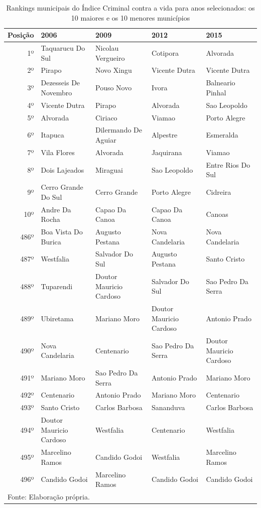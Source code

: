 \documentclass[12pt,openright,oneside,a4paper,english,french,spanish]{abntex2}
\numberwithin{table}{section} %
\numberwithin{figure}{section} %
\begin{document}
\begin{table}[H]
\caption{Rankings municipais do Índice Criminal contra a vida para anos selecionados: os 10 maiores e os 10 menores municípios}
\label{tab:rank_IVida}
\begin{tiny}
\centering
\begin{tabular}{rllll}
  \hline
Posição & 2006 & 2009 & 2012 & 2015 \\ 
  \hline
1º & Taquarucu Do Sul & Nicolau Vergueiro & Cotipora & Alvorada \\ 
2º & Pirapo & Novo Xingu & Vicente Dutra & Vicente Dutra \\ 
3º & Dezesseis De Novembro & Pouso Novo & Ivora & Balneario Pinhal \\ 
4º & Vicente Dutra & Pirapo & Alvorada & Sao Leopoldo \\ 
5º & Alvorada & Ciriaco & Viamao & Porto Alegre \\ 
6º & Itapuca & Dilermando De Aguiar & Alpestre & Esmeralda \\ 
7º & Vila Flores & Alvorada & Jaquirana & Viamao \\ 
8º & Dois Lajeados & Miraguai & Sao Leopoldo & Entre Rios Do Sul \\ 
9º & Cerro Grande Do Sul & Cerro Grande & Porto Alegre & Cidreira \\ 
10º & Andre Da Rocha & Capao Da Canoa & Capao Da Canoa & Canoas \\ 
486º & Boa Vista Do Burica & Augusto Pestana & Nova Candelaria & Nova Candelaria \\ 
487º & Westfalia & Salvador Do Sul & Augusto Pestana & Santo Cristo \\ 
488º & Tuparendi & Doutor Mauricio Cardoso & Salvador Do Sul & Sao Pedro Da Serra \\ 
489º & Ubiretama & Mariano Moro & Doutor Mauricio Cardoso & Antonio Prado \\ 
490º & Nova Candelaria & Centenario & Sao Pedro Da Serra & Doutor Mauricio Cardoso \\ 
491º & Mariano Moro & Sao Pedro Da Serra & Antonio Prado & Mariano Moro \\ 
492º & Centenario & Antonio Prado & Mariano Moro & Centenario \\ 
493º & Santo Cristo & Carlos Barbosa & Sananduva & Carlos Barbosa \\ 
494º & Doutor Mauricio Cardoso & Westfalia & Centenario & Westfalia \\ 
495º & Marcelino Ramos & Candido Godoi & Westfalia & Marcelino Ramos \\ 
496º & Candido Godoi & Marcelino Ramos & Candido Godoi & Candido Godoi \\ 
   \hline
\multicolumn{5}{l}{Fonte: Elaboração própria.}
\end{tabular}
\end{tiny}
\end{table}
\end{document}
